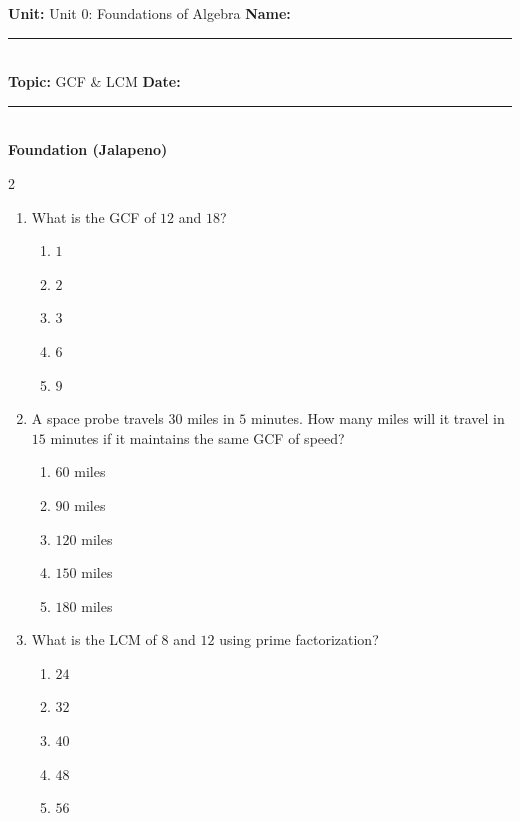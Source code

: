 \documentclass[10pt]{article}
\begin{document}
\enlargethispage{2.5cm}

\begin{tcolorbox}[colback=mainblue!5, colframe=mainblue, sharp corners, boxrule=0.5pt]
    \small \textbf{Unit:} Unit 0: Foundations of Algebra \hfill \textbf{Name:} \rule{3cm}{0.4pt} \\
    \small \textbf{Topic:} GCF & LCM \hfill \textbf{Date:} \rule{2cm}{0.4pt} \\
    \centering \textbf{\large Foundation (Jalapeno)}
\end{tcolorbox}

\vspace{0.2cm}

\begin{multicols}{2}
\begin{enumerate}[label=\textbf{Q\arabic*.}, leftmargin=*, itemsep=6pt, parsep=0pt]

  \item \small What is the GCF of $12$ and $18$?
  \begin{enumerate}[label=(\Alph*), leftmargin=0.6cm, nosep, itemsep=2pt]
    \item $1$
    \item $2$
    \item $3$
    \item $6$
    \item $9$
  \end{enumerate}

  \item \small A space probe travels $30$ miles in $5$ minutes. How many miles will it travel in $15$ minutes if it maintains the same GCF of speed?
  \begin{enumerate}[label=(\Alph*), leftmargin=0.6cm, nosep, itemsep=2pt]
    \item $60$ miles
    \item $90$ miles
    \item $120$ miles
    \item $150$ miles
    \item $180$ miles
  \end{enumerate}

  \item \small What is the LCM of $8$ and $12$ using prime factorization?
  \begin{enumerate}[label=(\Alph*), leftmargin=0.6cm, nosep, itemsep=2pt]
    \item $24$
    \item $32$
    \item $40$
    \item $48$
    \item $56$
  \end{enumerate}


\end{enumerate}
\end{multicols}
\end{document}
